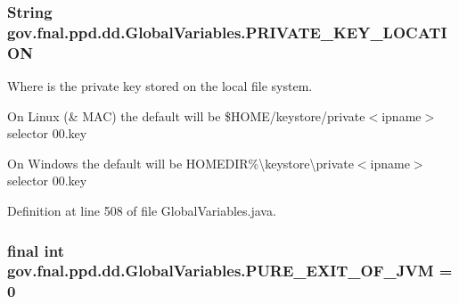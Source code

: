 \hypertarget{classgov_1_1fnal_1_1ppd_1_1dd_1_1GlobalVariables_aa26c21d05850efb85c8f5517d8258e5d}{
\subsubsection[{P\-R\-I\-V\-A\-T\-E\-\_\-\-K\-E\-Y\-\_\-\-L\-O\-C\-A\-T\-I\-O\-N}]{\setlength{\rightskip}{0pt plus 5cm}String gov.\-fnal.\-ppd.\-dd.\-Global\-Variables.\-P\-R\-I\-V\-A\-T\-E\-\_\-\-K\-E\-Y\-\_\-\-L\-O\-C\-A\-T\-I\-O\-N\hspace{0.3cm}{\ttfamily [static]}}}\label{classgov_1_1fnal_1_1ppd_1_1dd_1_1GlobalVariables_aa26c21d05850efb85c8f5517d8258e5d}
Where is the private key stored on the local file system.

On Linux (\& M\-A\-C) the default will be \$\-H\-O\-M\-E/keystore/private$<$ipname$>$ selector 00.\-key

On Windows the default will be H\-O\-M\-E\-D\-I\-R\%\textbackslash{}keystore\textbackslash{}private$<$ipname$>$ selector 00.\-key 

Definition at line 508 of file Global\-Variables.\-java.

\hypertarget{classgov_1_1fnal_1_1ppd_1_1dd_1_1GlobalVariables_a9a5a3b99227fe4929fc0c3c664a922da}{
\subsubsection[{P\-U\-R\-E\-\_\-\-E\-X\-I\-T\-\_\-\-O\-F\-\_\-\-J\-V\-M}]{\setlength{\rightskip}{0pt plus 5cm}final int gov.\-fnal.\-ppd.\-dd.\-Global\-Variables.\-P\-U\-R\-E\-\_\-\-E\-X\-I\-T\-\_\-\-O\-F\-\_\-\-J\-V\-M = 0\hspace{0.3cm}{\ttfamily [static]}}}\label{classgov_1_1fnal_1_1ppd_1_1dd_1_1GlobalVariables_a9a5a3b99227fe4929fc0c3c664a922da}


